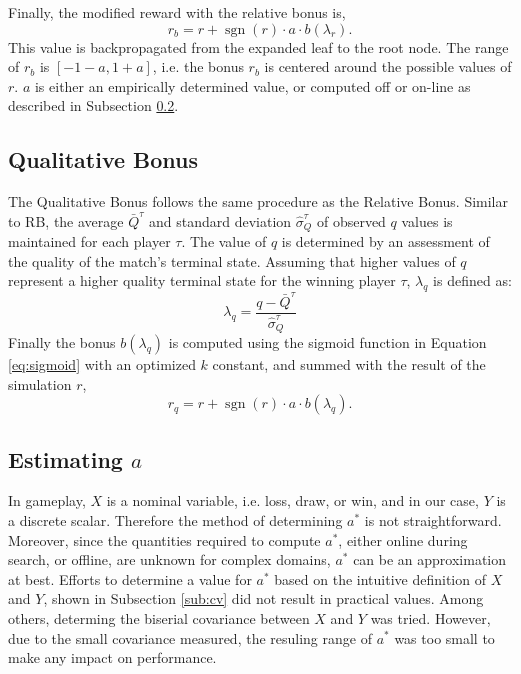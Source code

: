 \documentclass{ecai2014}
\newcommand{\sgn}{\mathop{\mathrm{sgn}}}
\begin{document}
Finally, the modified reward with the relative bonus is, 
\begin{equation}
r_b=r+\sgn(r) \cdot a \cdot b(\lambda_r).
\label{eq:rb}
\end{equation}
This value is backpropagated from the expanded leaf to the root node. The range of $r_b$ is $[-1-a, 1+a]$, i.e. the bonus $r_b$ is centered around the possible values of $r$. $a$ is either an empirically determined value, or computed off or on-line as described in Subsection \ref{subsec:astar}.

\subsection{Qualitative Bonus}
\label{subsec:qb}
The Qualitative Bonus follows the same procedure as the Relative Bonus. Similar to RB, the average $\bar{Q}^\tau$ and standard deviation $\hat{\sigma}^\tau_Q$ of observed $q$ values is maintained for each player $\tau$. The value of $q$ is determined by an assessment of the quality of the match's terminal state. Assuming that higher values of $q$ represent a higher quality terminal state for the winning player $\tau$, $\lambda_q$ is defined as:
\begin{equation}
\lambda_q = \frac{q - \bar{Q}^\tau}{\hat{\sigma}^\tau_Q}
\label{eq:qb_norm}
\end{equation}
Finally the bonus $b(\lambda_q)$ is computed using the sigmoid function in Equation \ref{eq:sigmoid} with an optimized $k$ constant, and summed with the result of the simulation $r$,
\begin{equation}
r_q=r+\sgn(r) \cdot a \cdot b(\lambda_q).
\label{eq:qb}
\end{equation}

\subsection{Estimating $a$}
\label{subsec:astar}
In gameplay, $X$ is a nominal variable, i.e. loss, draw, or win, and in our case, $Y$ is a discrete scalar. Therefore the method of determining $a^*$ is not straightforward. Moreover, since the quantities required to compute $a^*$, either online during search, or offline, are unknown for complex domains, $a^*$ can be an approximation at best. 
Efforts to determine a value for $a^*$ based on the intuitive definition of $X$ and $Y$, shown in Subsection \ref{sub:cv} did not result in practical values. Among others, determing the biserial covariance between $X$ and $Y$ was tried. However, due to the small covariance measured, the resuling range of $a^*$ was too small to make any impact on performance.
\end{document}
